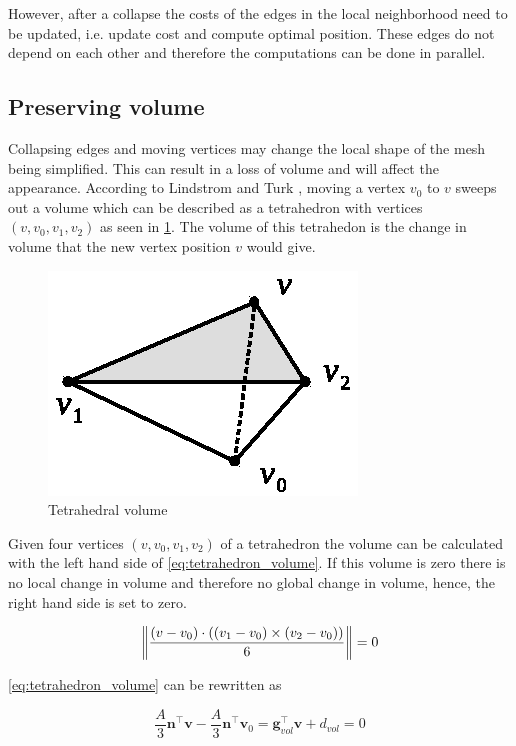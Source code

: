 However, after a collapse the costs of the edges in the local neighborhood need to be updated, i.e. update cost and compute optimal position. These edges do not depend on each other and therefore the computations can be done in parallel.

\subsection{Preserving volume}
Collapsing edges and moving vertices may change the local shape of the mesh being simplified. This can result in a loss of volume and will affect the appearance. According to Lindstrom and Turk \cite{lindstrom1998fast} , moving a vertex $v_0$ to $v$ sweeps out a volume which can be described as a tetrahedron with vertices $(v, v_0, v_1, v_2)$ as seen in \cref{fig:tetrahedron}. The volume of this tetrahedon is the change in volume that the new vertex position $v$ would give. 

\begin{figure}[h]
    \centering
    \includegraphics[width=.5\textwidth]{figures/tetrahedron.eps}
    \caption{Tetrahedral volume}
    \label{fig:tetrahedron}
\end{figure}

Given four vertices $(v, v_0, v_1, v_2)$ of a tetrahedron the volume can be calculated with the left hand side of \cref{eq:tetrahedron_volume}. If this volume is zero there is no local change in volume and therefore no global change in volume, hence, the right hand side is set to zero.

\begin{equation} \label{eq:tetrahedron_volume}
\norm*{\frac{(v - v_0) \cdot ((v_1-v_0) \times (v_2 - v_0))}{6}} = 0
\end{equation}

\cref{eq:tetrahedron_volume} can be rewritten as 

\begin{equation} \label{eq:volume_constraint}
\frac{A}{3} \mathbf{n}^\intercal \mathbf{v} - \frac{A}{3} \mathbf{n}^\intercal \mathbf{v}_0 = \mathbf{g}_{vol}^\intercal \mathbf{v} + d_{vol} = 0
\end{equation}


